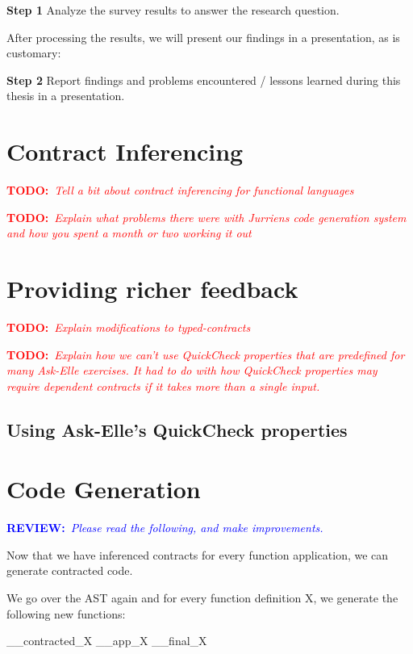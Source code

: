\documentclass[10pt,a4paper]{article}
\newcommand{\annotate}[3]{
	\begin{scriptsize}
	\textcolor{#1}{\textbf{#2}~\textit{#3}}
	\end{scriptsize}\newline}
\newcommand{\todo}[1]{\annotate{red} {TODO:} {#1}}
\newcommand{\review}{\annotate{blue} {REVIEW:} {Please read the following, and make improvements. \newline}}
\begin{document}
\begin{description}
	\item{\textbf{Step 1}} Analyze the survey results to answer the research question.
\end{description}

After processing the results, we will present our findings in a presentation, as is customary:

\begin{description}
	\item{\textbf{Step 2}} Report findings and problems encountered / lessons learned during this thesis in a presentation.
\end{description}

\section{Contract Inferencing}

\todo{Tell a bit about contract inferencing for functional languages}
\todo{Explain what problems there were with Jurriens code generation system and how you spent a month or two working it out}

\section{Providing richer feedback}

\todo{Explain modifications to typed-contracts}
\todo{Explain how we can't use QuickCheck properties that are predefined for many Ask-Elle exercises. It had to do with how QuickCheck properties may require dependent contracts if it takes more than a single input.}

\subsection{Using Ask-Elle's QuickCheck properties}


\section{Code Generation}

\review

Now that we have inferenced contracts for every function application, we can generate contracted code.

We go over the AST again and for every function definition X, we generate the following new functions:

\_\_contracted\_X
\_\_app\_X
\_\_final\_X
\end{document}
